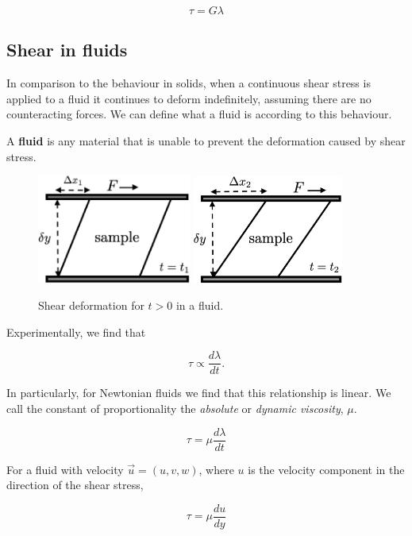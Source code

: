 \begin{equation}\label{eq:shear-in-solids}
  \tau = G \lambda
\end{equation}

\subsection{Shear in fluids}

In comparison to the behaviour in solids, when a continuous shear stress is applied to a fluid it continues to deform indefinitely, assuming there are no counteracting forces. We can define what a fluid is according to this behaviour.

\begin{definition}
  A \textbf{fluid} is any material that is unable to prevent the deformation caused by shear stress.
\end{definition}

\begin{figure}[h] \label{fig:shear-fluid}
  \centering
  \includegraphics[width=5.05cm]{fig/shear-fluid-t1.png}
  \includegraphics[width=4.95cm]{fig/shear-fluid-t2.png}
  \caption{Shear deformation for $t>0$ in a fluid.}
\end{figure}

Experimentally, we find that

\begin{equation}
  \tau \propto \frac{ d \lambda }{ d t }.
\end{equation}

In particularly, for Newtonian fluids we find that this relationship is linear. We call the constant of proportionality the \textit{absolute} or \textit{dynamic viscosity}, $\mu$.

\begin{equation} \label{eq:shear-stress-strain-in-liquids}
  \tau = \mu \frac{ d \lambda }{ d t }
\end{equation}

\begin{proposition}
  For a fluid with velocity $\vec{u} = (u,v,w)$, where $u$ is the velocity component in the direction of the shear stress,

  \begin{equation*}
    \tau = \mu \frac{ d u }{ d y }
  \end{equation*}
  
\end{proposition}

